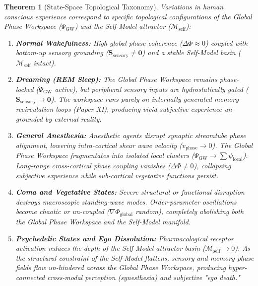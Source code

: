 \documentclass[11pt,a4paper]{article}
\newtheorem{thm}{Theorem}
\begin{document}
	\begin{thm}[State-Space Topological Taxonomy]
		\label{thm:conscious_state_taxonomy}
		Variations in human conscious experience correspond to specific topological configurations of the Global Phase Workspace ($\Psi_{\text{GW}}$) and the Self-Model attractor ($\mathcal{M}_{\text{self}}$):
		\begin{enumerate}
			\item \textbf{Normal Wakefulness:} High global phase coherence ($\Delta \Phi \approx 0$) coupled with bottom-up sensory grounding ($\mathbf{S}_{\text{sensory}} \neq \mathbf{0}$) and a stable Self-Model basin ($\mathcal{M}_{\text{self}}$ intact).
			
			\item \textbf{Dreaming (REM Sleep):} The Global Phase Workspace remains phase-locked ($\Psi_{\text{GW}}$ active), but peripheral sensory inputs are hydrostatically gated ($\mathbf{S}_{\text{sensory}} \to \mathbf{0}$). The workspace runs purely on internally generated memory recirculation loops (Paper XI), producing vivid subjective experience un-grounded by external reality.
			
			\item \textbf{General Anesthesia:} Anesthetic agents disrupt synaptic streamtube phase alignment, lowering intra-cortical shear wave velocity ($v_{\text{phase}} \to 0$). The Global Phase Workspace fragmentates into isolated local clusters ($\Psi_{\text{GW}} \to \sum \psi_{\text{local}}$). Long-range cross-cortical phase coupling vanishes ($\Delta \Phi \neq 0$), collapsing subjective experience while sub-cortical vegetative functions persist.
			
			\item \textbf{Coma and Vegetative States:} Severe structural or functional disruption destroys macroscopic standing-wave modes. Order-parameter oscillations become chaotic or un-coupled ($\nabla \Phi_{\text{global}}$ random), completely abolishing both the Global Phase Workspace and the Self-Model manifold.
			
			\item \textbf{Psychedelic States and Ego Dissolution:} Pharmacological receptor activation reduces the depth of the Self-Model attractor basin ($\mathcal{M}_{\text{self}} \to 0$). As the structural constraint of the Self-Model flattens, sensory and memory phase fields flow un-hindered across the Global Phase Workspace, producing hyper-connected cross-modal perception (synesthesia) and subjective "ego death."
		\end{enumerate}
	\end{thm}
	
\end{document}
